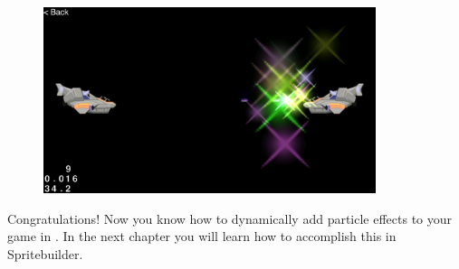 \begin{figure}[H]
		\centering
		\includegraphics[width=275pt]{images/particles/particle_explosion.png}   
\end{figure}

Congratulations! Now you know how to dynamically add particle effects to your
game in \cocos{}. In the next chapter you will learn how to accomplish this in
Spritebuilder.

